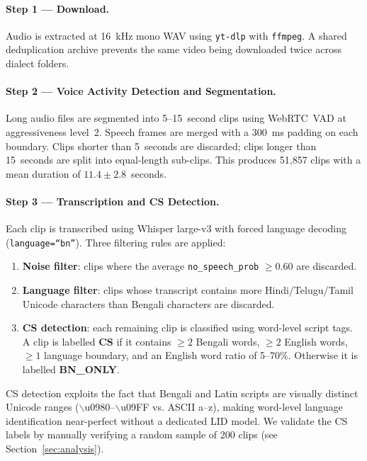 \paragraph{Step 1 --- Download.}
Audio is extracted at 16~kHz mono WAV using \texttt{yt-dlp} with
\texttt{ffmpeg}. A shared deduplication archive prevents the same video being
downloaded twice across dialect folders.

\paragraph{Step 2 --- Voice Activity Detection and Segmentation.}
Long audio files are segmented into 5--15~second clips using WebRTC~VAD
\citep{webrtcvad} at aggressiveness level~2.
Speech frames are merged with a 300~ms padding on each boundary.
Clips shorter than 5~seconds are discarded; clips longer than 15~seconds are
split into equal-length sub-clips.
This produces 51,857 clips with a mean duration of $11.4 \pm 2.8$~seconds.

\paragraph{Step 3 --- Transcription and CS Detection.}
Each clip is transcribed using Whisper large-v3 \citep{radford2023whisper}
with forced language decoding (\texttt{language=``bn''}).
Three filtering rules are applied:
\begin{enumerate}[leftmargin=2em, itemsep=1pt]
  \item \textbf{Noise filter}: clips where the average \texttt{no\_speech\_prob}
        $\geq 0.60$ are discarded.
  \item \textbf{Language filter}: clips whose transcript contains more
        Hindi/Telugu/Tamil Unicode characters than Bengali characters are
        discarded.
  \item \textbf{CS detection}: each remaining clip is classified using
        word-level script tags. A clip is labelled \textbf{CS} if it contains
        $\geq 2$ Bengali words, $\geq 2$ English words, $\geq 1$ language
        boundary, and an English word ratio of 5--70\%. Otherwise it is
        labelled \textbf{BN\_ONLY}.
\end{enumerate}

CS detection exploits the fact that Bengali and Latin scripts are visually
distinct Unicode ranges ($\backslash$u0980--$\backslash$u09FF vs. ASCII
a--z), making word-level language identification near-perfect without a
dedicated LID model.
We validate the CS labels by manually verifying a random sample of 200 clips
(see Section~\ref{sec:analysis}).

